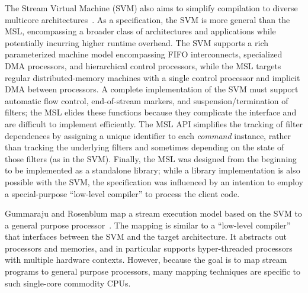 The Stream Virtual Machine (SVM) also aims to simplify compilation to
diverse multicore architectures~\cite{svm:specs,svm}.  As a specification,
the SVM is more general than the MSL, encompassing a broader class of
architectures and applications while potentially incurring higher
runtime overhead.  The SVM supports a rich parameterized machine model
encompassing FIFO interconnects, specialized DMA processors, and
hierarchical control processors, while the MSL targets regular
distributed-memory machines with a single control processor and
implicit DMA between processors.  A complete implementation of the SVM
must support automatic flow control, end-of-stream markers, and
suspension/termination of filters; the MSL elides these functions
because they complicate the interface and are difficult to implement
efficiently.  The MSL API simplifies the tracking of filter
dependences by assigning a unique identifier to each {\it command}
instance, rather than tracking the underlying filters and sometimes
depending on the state of those filters (as in the SVM).  Finally, the
MSL was designed from the beginning to be implemented as a standalone
library; while a library implementation is also possible with the SVM,
the specification was influenced by an intention to employ a
special-purpose ``low-level compiler'' to process the client code.

Gummaraju and Rosenblum map a stream execution model based on the SVM
to a general purpose processor~\cite{streamgpp}. The mapping 
is similar to a ``low-level compiler'' that interfaces between the SVM
and the target architecture. It abstracts out processors and memories, 
and in particular supports hyper-threaded processors with multiple
hardware contexts. However, because the goal is to map stream
programs to general purpose processors, many mapping techniques are specific to
such single-core commodity CPUs.


